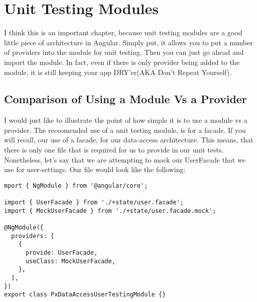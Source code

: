\maketitle{}
\section{ Unit Testing Modules }
I think this is an important chapter, because unit testing modules are a good
little piece of architecture in Angular. Simply put, it allows you to put a
number of providers into the module for unit testing. Then you can just go
ahead and import the module. In fact, even if there is only provider being
added to the module, it is still keeping your app DRY'er(AKA Don't Repeat
Yourself).

\subsection{Comparison of Using a Module Vs a Provider}
I would just like to illustrate the point of how simple it is to use a module
vs a provider. The reccomended use of a unit testing module, is for a facade.
If you will recall, our use of a facade, for our data-access architecture. This
means, that there is only one file that is required for us to provide in our
unit tests. Nonetheless, let's say that we are attempting to mock our UserFacade
that we use for user-settings. Our file would look like the following:

\begin{lstlisting}
mport { NgModule } from '@angular/core';

import { UserFacade } from './+state/user.facade';
import { MockUserFacade } from './+state/user.facade.mock';

@NgModule({
  providers: [
    {
      provide: UserFacade,
      useClass: MockUserFacade,
    },
  ],
})
export class PxDataAccessUserTestingModule {}
\end{lstlisting}
